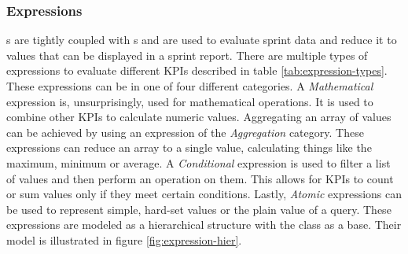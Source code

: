 \subsubsection*{Expressions}\label{model-expressions}

s are tightly coupled with s and are used to evaluate sprint data and reduce it to values that can be displayed in a sprint report.
There are multiple types of expressions to evaluate different KPIs described in table \ref{tab:expression-types}.
These expressions can be in one of four different categories.
A \textit{Mathematical} expression is, unsurprisingly, used for mathematical operations.
It is used to combine other KPIs to calculate numeric values.
Aggregating an array of values can be achieved by using an expression of the \textit{Aggregation} category.
These expressions can reduce an array to a single value, calculating things like the maximum, minimum or average.
A \textit{Conditional} expression is used to filter a list of values and then perform an operation on them.
This allows for KPIs to count or sum values only if they meet certain conditions.
Lastly, \textit{Atomic} expressions can be used to represent simple, hard-set values or the plain value of a query. 
These expressions are modeled as a hierarchical structure with the  class as a base.
Their model is illustrated in figure \ref{fig:expression-hier}.

